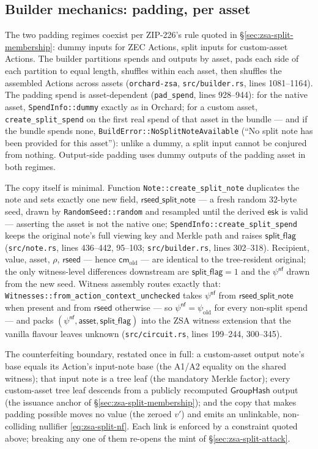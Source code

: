 \documentclass[11pt,a4paper]{article}
\theoremstyle{definition}
\newcommand{\nfsym}{\mathsf{nf}}
\newcommand{\cmsym}{\mathsf{cm}}
\newcommand{\GroupHash}{\ensuremath{\mathsf{GroupHash}}}
\begin{document}
\subsection{Builder mechanics: padding, per asset}
\label{sec:zsa-split-builder}

The two padding regimes coexist per ZIP-226's rule quoted in
\S\ref{sec:zsa-split-membership}: dummy inputs for ZEC Actions, split
inputs for custom-asset Actions. The builder partitions spends and
outputs by asset, pads each side of each partition to equal length,
shuffles within each asset, then shuffles the assembled Actions across
assets (\texttt{orchard-zsa}, \texttt{src/builder.rs}, lines 1081--1164).
The padding spend is asset-dependent (\texttt{pad\_spend}, lines
928--944): for the native asset, \texttt{SpendInfo::dummy} exactly as in
Orchard; for a custom asset, \texttt{create\_split\_spend} on the first
real spend of that asset in the bundle --- and if the bundle spends none,
\texttt{BuildError::NoSplitNoteAvailable} (``No split note has been
provided for this asset''): unlike a dummy, a split input cannot be
conjured from nothing. Output-side padding uses dummy outputs of the
padding asset in both regimes.

The copy itself is minimal. Function \texttt{Note::create\_split\_note}
duplicates the note and sets exactly one new field,
$\mathsf{rseed\_split\_note}$ --- a fresh random $32$-byte seed, drawn by
\texttt{RandomSeed::random} and resampled until the derived
$\mathsf{esk}$ is valid --- asserting the asset is not the native one;
\texttt{SpendInfo::create\_split\_spend} keeps the original note's full
viewing key and Merkle path and raises $\mathsf{split\_flag}$
(\texttt{src/note.rs}, lines 436--442, 95--103; \texttt{src/builder.rs},
lines 302--318). Recipient, value, asset, $\rho$, $\mathsf{rseed}$ ---
hence $\cmsym_{\mathrm{old}}$ --- are identical to the tree-resident
original; the only witness-level differences downstream are
$\mathsf{split\_flag} = 1$ and the $\psi^{\nfsym}$ drawn from the new
seed. Witness assembly routes exactly that:
\texttt{Witnesses::from\_action\_context\_unchecked} takes
$\psi^{\nfsym}$ from $\mathsf{rseed\_split\_note}$ when present and from
$\mathsf{rseed}$ otherwise --- so $\psi^{\nfsym} = \psi_{\mathrm{old}}$
for every non-split spend --- and packs $(\psi^{\nfsym}, \mathsf{asset},
\mathsf{split\_flag})$ into the ZSA witness extension that the vanilla
flavour leaves unknown (\texttt{src/circuit.rs}, lines 199--244,
300--345).

The counterfeiting boundary, restated once in full: a custom-asset output
note's base equals its Action's input-note base (the A1/A2 equality on
the shared witness); that input note is a tree leaf (the mandatory Merkle
factor); every custom-asset tree leaf descends from a publicly recomputed
$\GroupHash$ output (the issuance anchor of
\S\ref{sec:zsa-split-membership}); and the copy that makes padding
possible moves no value (the zeroed $v'$) and emits an unlinkable,
non-colliding nullifier \eqref{eq:zsa-split-nf}. Each link is enforced by
a constraint quoted above; breaking any one of them re-opens the mint of
\S\ref{sec:zsa-split-attack}.
\end{document}
